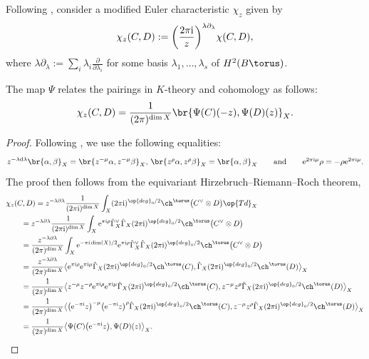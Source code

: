 Following \cite{CIJ}, consider a modified Euler characteristic $\chi_z$ given by
\[
\chi_z(C, D) := \biggl(\frac{2 \pi {\rm i}}{ z}\biggr)^{\lambda \partial_\lambda} \chi(C, D),
\]
where $\lambda \partial_\lambda := \sum_i \lambda_i \frac{\partial}{\partial \lambda_i}$ for some basis $\lambda_1, \dots, \lambda_s$ of $H^2(B\torus)$.


\begin{Lemma}
The map $\Psi$ relates the pairings in $K$-theory and cohomology as follows:
\[
\chi_z(C, D) = \frac{1}{ (2 \pi)^{\dim X}}\br{\Psi(C)(-z), \Psi(D)(z)}_X.
\]
\end{Lemma}
\begin{proof}
Following \cite[Proposition~3.2]{CIJ}, we use the following equalities:
\[
 z^{-\lambda {\rm d}\lambda} \br{\alpha,\beta}_X=\br{z^{-\mu}\alpha,z^{-\mu}\beta}_X$, $\br{z^{\rho}\alpha,z^\rho \beta}_X=\br{\alpha,\beta}_X
 \qquad \text{and}\qquad {\rm e}^{2\pi{\rm i}\mu}\rho=-\rho {\rm e}^{2\pi{\rm i}\mu}.
 \]
The proof then follows from the equivariant Hirzebruch--Riemann--Roch theorem,
\begin{align*}
&\chi_z(C, D)
 = z^{- \lambda \partial \lambda } \frac{1}{(2 \pi {\rm i})^{\dim X}} \int_X (2 \pi {\rm i})^{\op{deg}_0/2} \ch^\torus\bigl(C^\vee \otimes D\bigr) \op{Td}_X \\
&\qquad{} = z^{-\lambda \partial \lambda } \frac{1}{(2 \pi {\rm i})^{\dim X}} \int_X
 {\rm e}^{ \pi {\rm i} \rho} \hat \Gamma_X^\vee \hat \Gamma_X
(2 \pi {\rm i})^{\op{deg}_0/2} \ch^\torus\bigl(C^\vee \otimes D\bigr) \\
&\qquad{} = \frac{z^{-\lambda \partial \lambda }}{ (2 \pi)^{\dim X}} \int_X {\rm e}^{-\pi {\rm i} \dim(X)/2}
 {\rm e}^{\pi {\rm i} \rho} \hat \Gamma_X^\vee \hat \Gamma_X (2 \pi {\rm i})^{\op{deg}_0/2} \ch^\torus\bigl(C^\vee \otimes D\bigr)
 \\
&\qquad{}=
\frac{z^{-\lambda \partial \lambda }}{ (2 \pi)^{\dim X}}\bigl\langle {\rm e}^{\pi {\rm i} \rho} {\rm e}^{\pi {\rm i} \mu} \hat \Gamma_X (2 \pi {\rm i})^{\op{deg}_0/2}\ch^\torus(C), \hat \Gamma_X (2 \pi {\rm i})^{\op{deg}_0/2} \ch^\torus(D)\bigr\rangle_X \\
&\qquad{}=
\frac{1 }{ (2 \pi)^{\dim X}}\bigl\langle z^{- \mu} z^{- \rho} {\rm e}^{\pi {\rm i} \rho} {\rm e}^{\pi {\rm i} \mu} \hat \Gamma_X (2 \pi {\rm i})^{\op{deg}_0/2}\ch^\torus(C), z^{- \mu} z^{\rho} \hat \Gamma_X (2 \pi {\rm i})^{\op{deg}_0/2} \ch^\torus(D)\bigr\rangle_X \\
&\qquad{}=
\frac{1}{ (2 \pi)^{\dim X}}\bigl\langle\bigl( {\rm e}^{-\pi {\rm i}} z\bigr)^{- \mu} \bigl( {\rm e}^{-\pi {\rm i}}z\bigr)^\rho \hat \Gamma_X (2 \pi {\rm i})^{\op{deg}_0/2}\ch^\torus(C), z^{- \mu} z^{\rho} \hat \Gamma_X (2 \pi {\rm i})^{\op{deg}_0/2} \ch^\torus(D)\bigr\rangle_X \\
&\qquad{}= \frac{1}{ (2 \pi)^{\dim X}}\bigl\langle\Psi(C)\bigl( {\rm e}^{-\pi {\rm i}} z\bigr), \Psi(D)(z)\bigr\rangle_X.
\tag*{\qed}
\end{align*}
\renewcommand{\qed}{}
\end{proof}



